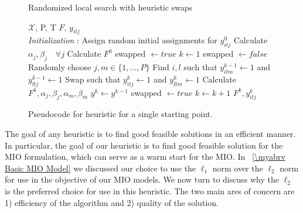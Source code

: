 \begin{figure}[ht] 
 \removelatexerror
\begin{algorithm}[H]
 \caption{Randomized local search with heuristic swaps}
 \label{alg:Basic_Heuristic}
 \begin{algorithmic}[1]
  \renewcommand{\algorithmicrequire}{\textbf{Input:}}
  \renewcommand{\algorithmicensure}{\textbf{Output:}}
 \REQUIRE $\boldsymbol{\mathcal{X}}$, P, T
 \ENSURE  $F$, $y_{itj}$
 \\ \textit{Initialization} : Assign random initial assignments for $y^{0}_{itj}$
  \STATE Calculate $\alpha_{j}, \beta_{j} \quad \forall j $
  \STATE Calculate $F^{0}$
  \STATE swapped $\leftarrow true$
  \STATE $k\leftarrow1$
  \STATE swapped $\leftarrow false$
  \STATE Randomly choose $j,m\in\{1,\ldots,P\}$
  \STATE Find $i,l$ such that $y^{k-1}_{itm}\leftarrow1$ and $y^{k-1}_{ltj}\leftarrow1$
  \STATE Swap such that $y^{k}_{itj}\leftarrow1$ and $y^{k}_{ltm}\leftarrow1$
  \STATE Calculate $F^{k}, \alpha_{j}, \beta_{j}, \alpha_{m}, \beta_{m}$
  \STATE $y^{k} \leftarrow y^{k-1}$
  \ELSE 
  \STATE swapped $\leftarrow true$
  \ENDIF
  \ENDFOR
  \STATE $ k \leftarrow k + 1 $
  \ENDWHILE
 \RETURN $F^{k}, y^{k}_{itj}$ 
 \end{algorithmic} 
 \end{algorithm}
  \caption{Pseudocode for heuristic for a single starting point.}
  \label{fig:Basic_Heuristic}
 \end{figure}

The goal of any heuristic is to find good feasible solutions in an efficient manner. In particular, the goal of our heuristic is to find good feasible solution for the MIO formulation, which can serve as a warm start for the MIO. In \mysection~\ref{\myabrv Basic MIO Model} we discussed our choice to use the $\ell_1$ norm over the $\ell_2$ norm for use in the objective of our MIO models. We now turn to discuss why the $\ell_2$ is the preferred choice for use in this heuristic. The two main ares of concern are 1) efficiency of the algorithm and 2) quality of the solution.

